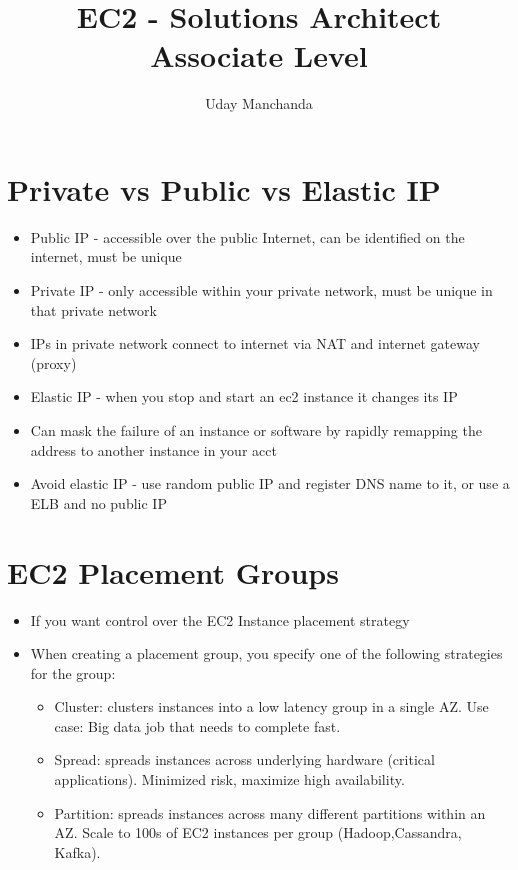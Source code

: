 \documentclass[]{scrartcl}
\title{EC2 - Solutions Architect Associate Level}
\author{Uday Manchanda}
\begin{document}
\maketitle

\section{Private vs Public vs Elastic IP}
\begin{itemize}
	\item Public IP - accessible over the public Internet, can be identified on the internet, must be unique
	\item Private IP - only accessible within your private network, must be unique in that private network
	\item IPs in private network connect to internet via NAT and internet gateway (proxy)
	\item Elastic IP - when you stop and start an ec2 instance it changes its IP
	\item Can mask the failure of an instance or software by rapidly remapping the address to another instance in your acct
	\item Avoid elastic IP - use random public IP and register DNS name to it, or use a ELB and no public IP
\end{itemize}

\section{EC2 Placement Groups}
\begin{itemize}
	\item If you want control over the EC2 Instance placement strategy
	\item When creating a placement group, you specify one of the following strategies for the group:
	\begin{itemize}
		\item Cluster: clusters instances into a low latency group in a single AZ. Use case: Big data job that needs to complete fast. 
		\item Spread: spreads instances across underlying hardware (critical applications). Minimized risk, maximize high availability. 
		\item Partition: spreads instances across many different partitions within an AZ. Scale to 100s of EC2 instances per group (Hadoop,Cassandra, Kafka). 
	\end{itemize}
\end{itemize}
\end{document}
